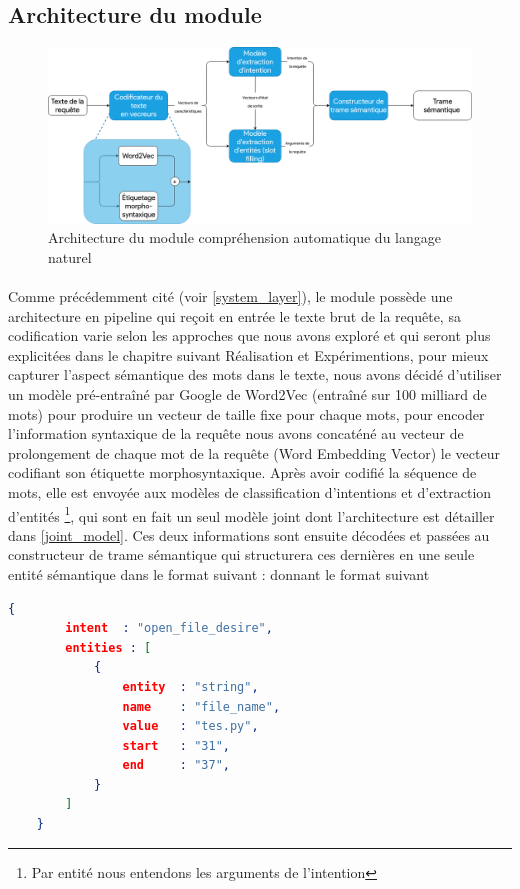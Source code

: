 	\subsection{Architecture du module}
	\begin{figure}[H] 
		\label{nlu_arch}
		\centering
		\includegraphics[width=0.88\linewidth]{images/Conception/NLU/nlu_module_arch.png}
		\caption{Architecture du module compréhension automatique du langage naturel}
	\end{figure}
	\paragraph{}
	Comme précédemment cité (voir \ref{system_layer}), le module possède une architecture en pipeline qui reçoit en entrée le texte brut de la requête, sa codification varie selon les approches que nous avons exploré et qui seront plus explicitées dans le chapitre suivant Réalisation et Expérimentions, pour mieux capturer l'aspect sémantique des mots dans le texte, nous avons décidé d'utiliser un modèle pré-entraîné par Google de Word2Vec (entraîné sur 100 milliard de mots) pour produire un vecteur de taille fixe pour chaque mots, pour encoder l'information syntaxique de la requête nous avons concaténé au vecteur de prolongement de chaque mot de la requête (Word Embedding Vector) le vecteur codifiant son étiquette morphosyntaxique. Après avoir codifié la séquence de mots, elle est envoyée aux modèles de classification d'intentions et d'extraction d'entités \footnote{Par entité nous entendons les arguments de l'intention}, qui sont en fait un seul modèle joint dont l'architecture est détailler dans \ref{joint_model}. Ces deux informations sont ensuite décodées et passées au constructeur de trame sémantique qui structurera ces dernières en une seule entité sémantique dans le format suivant : 
	donnant le format suivant \begin{lstlisting}[language=json]
	{
		intent  : "open_file_desire",
		entities : [
			{	
				entity	: "string",
				name	: "file_name",
				value	: "tes.py",
				start	: "31",
				end		: "37",
			}
		]
	}
	\end{lstlisting}
	
